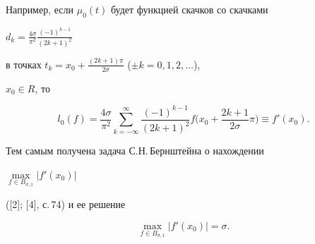  


Например, если $\mu_0(t)$ будет функцией скачков со скачками 


$d_k=\frac{4\sigma}{\pi^2}\frac{(-1)^{k-1}}{(2k+1)^2}$ 


в точках $t_k=x_0+\frac{(2k+1)\pi}{2\sigma}$ ($\pm k=0,1,2,\dotsc$), 


$x_0\in R$, то 


$$ 


l_0(f)=\frac{4\sigma}{\pi^2}\sum^\infty_{k=-\infty} 


\frac{(-1)^{k-1}}{(2k+1)^2}f\bigg(x_0+\frac{2k+1}{2\sigma}\pi \bigg) 


\equiv f'(x_0). 


$$ 


 


Тем самым получена задача С.Н.\,Бернштейна о нахождении 


$\max\limits_{f\in B_{\sigma,1}}|f'(x_0)|$ 


([2]; [4], с.\,74) и ее решение 


$$ 


\max_{f\in B_{\sigma,1}}|f'(x_0)|=\sigma. 


$$ 


 


